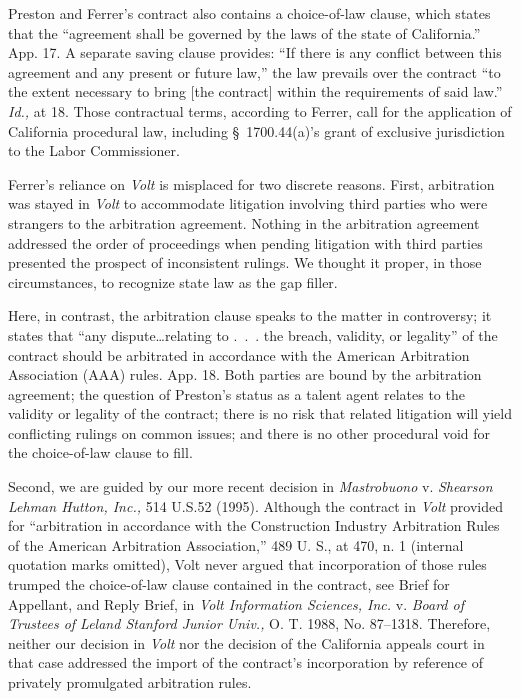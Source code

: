   Preston and Ferrer's contract also contains a choice-of-law clause,
which states that the ``agreement shall be governed by the laws of
the state of California.'' App. 17. A separate saving clause
provides: ``If there is any conflict between this agreement and any
present or future law,'' the law prevails over the contract ``to the
extent necessary to bring [the contract] within the requirements of
said law.'' \emph{Id.,} at 18. Those contractual terms, according
to Ferrer, call for the application of California procedural law,
including \S~1700.44(a)'s grant of exclusive jurisdiction to the
Labor Commissioner.

  Ferrer's reliance on \emph{Volt} is misplaced for two discrete reasons.
First, arbitration was stayed in \emph{Volt} to accommodate litigation
involving third parties who were strangers to the arbitration agreement.
Nothing in the arbitration agreement addressed the order of proceedings
when pending litigation with third parties presented the prospect of
inconsistent rulings. We thought it proper, in those circumstances, to
recognize state law as the gap filler.

  Here, in contrast, the arbitration clause speaks to the matter
in controversy; it states that ``any dispute\dots relating to
.~.~. the breach, validity, or legality'' of the contract should be
arbitrated in accordance with the American Arbitration Association (AAA)
rules. App. 18. Both parties are bound by the arbitration agreement; the
question of Preston's status as a talent agent relates to the validity
or legality of the contract; there is no risk that related litigation
will yield conflicting rulings on common issues; and there is no other
procedural void for the choice-of-law clause to fill.

  Second, we are guided by our more recent decision in \emph{Mastrobuono}
v. \emph{Shearson Lehman Hutton, Inc.,} 514 U.S.52 (1995). Although the
contract in \emph{Volt} provided for ``arbitration in accordance with the
Construction Industry Arbitration Rules of the American Arbitration
Association,'' 489 U. S., at 470, n. 1 (internal quotation marks
omitted), Volt never argued that incorporation of those rules trumped
the choice-of-law clause contained in the contract, see Brief for
\newpage  Appellant, and Reply Brief, in \emph{Volt Information Sciences,
Inc.} v. \emph{Board of Trustees of Leland Stanford Junior Univ.,} O. T.
1988, No. 87--1318. Therefore, neither our decision in \emph{Volt} nor
the decision of the California appeals court in that case addressed
the import of the contract's incorporation by reference of privately
promulgated arbitration rules.

